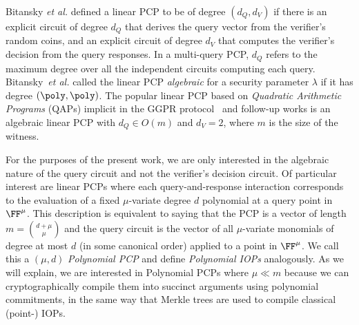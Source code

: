 Bitansky \emph{et al.} \cite{TCC:BCIOP13} defined a linear PCP to be of degree $(d_Q, d_V)$ if there is an explicit circuit of degree $d_Q$ that derives the query vector from the verifier's random coins, and an explicit circuit of degree $d_V$ that computes the verifier's decision from the query responses. %
In a multi-query PCP, $d_Q$ refers to the maximum degree over all the independent circuits computing each query. Bitansky~\emph{et al.} called the linear PCP \emph{algebraic} for a security parameter $\lambda$ if it has degree $(\poly, \poly)$. The popular linear PCP based on \emph{Quadratic Arithmetic Programs} (QAPs) implicit in the GGPR protocol~\cite{EC:GGPR13} and follow-up works is an algebraic linear PCP with $d_Q \in O(m)$ and $d_V = 2$, where $m$ is the size of the witness.

For the purposes of the present work, we are only interested in the algebraic nature of the query circuit and not the verifier's decision circuit. Of particular interest are linear PCPs where each query-and-response interaction corresponds to the evaluation of a fixed $\mu$-variate degree $d$ polynomial at a query point in $\FF^\mu$. This description is equivalent to saying that the PCP is a vector of length $m = {d + \mu \choose \mu}$ and the query circuit is the vector of all $\mu$-variate monomials of degree at most $d$ (in some canonical order) applied to a point in $\FF^\mu$. We call this a $(\mu, d)$ \emph{Polynomial PCP} and define \emph{Polynomial IOPs} analogously. As we will explain, we are interested in Polynomial PCPs where $\mu \ll m$ because we can cryptographically compile them into succinct arguments using polynomial commitments, in the same way that Merkle trees are used to compile classical (point-) IOPs. %

